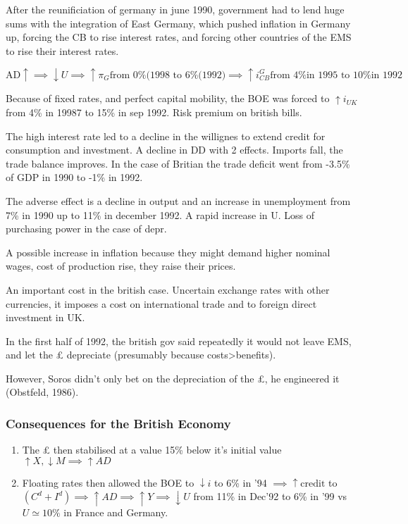 \documentclass{report}
\begin{document}
After the reunificiation of germany in june 1990, government had to lend huge sums with the integration of East Germany, which pushed inflation in Germany up, forcing the CB to rise interest rates, and forcing other countries of the EMS to rise their interest rates. 

$$\text{AD} \uparrow \implies \downarrow U \implies \uparrow \pi_G \text{from 0\% (1998 to 6\%(1992)} \implies \uparrow i^G_{CB} \text{from 4\% in 1995 to 10\% in 1992}$$

Because of fixed rates, and perfect capital mobility, the BOE was forced to $\uparrow i_{UK}$ from 4\% in 19987 to 15\% in sep 1992. Risk premium on british bills.

The high interest rate led to a decline in the willignes to extend credit for consumption and investment. A decline in DD with 2 effects. Imports fall, the trade balance improves. In the case of Britian the trade deficit went from -3.5\% of GDP in 1990 to -1\% in 1992. 

The adverse effect is a decline in output and an increase in unemployment from 7\% in 1990 up to 11\% in december 1992. A rapid increase in U. Loss of purchasing power in the case of depr.

A possible increase in inflation because they might demand higher nominal wages, cost of production rise, they raise their prices. 

An important cost in the british case. Uncertain exchange rates with other currencies, it imposes a cost on international trade and to foreign direct investment in UK. 


In the first half of 1992, the british gov said repeatedly it would not leave EMS, and let the £ depreciate (presumably because costs>benefits). 

However, Soros didn't only bet on the depreciation of the £, he engineered it (Obstfeld, 1986). 

\subsubsection{Consequences for the British Economy}

\begin{enumerate}
    \item The £ then stabilised at a value 15\% below it's initial value $\uparrow X, \downarrow M \implies \uparrow AD$
    \item Floating rates then allowed the BOE to $\downarrow i$ to 6\% in '94 $\implies \uparrow \text{credit}$ to $(C^d+I^d) \implies \uparrow AD \implies \uparrow Y \implies \downarrow U$ from 11\% in Dec'92 to 6\% in '99 vs $U\simeq 10\%$ in France and Germany.
\end{enumerate}
\end{document}
